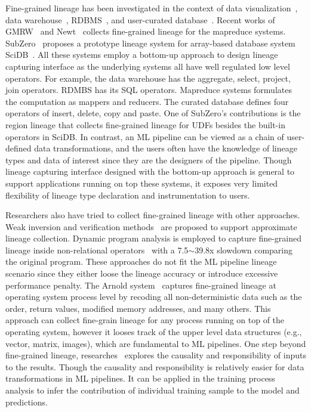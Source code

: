\documentclass{sig-alternate}
\begin{document}
Fine-grained lineage has been investigated in the context of data visualization~\cite{stonebraker93, woodruff97},  
data warehouse~\cite{cui00, cui03}, RDBMS~\cite{widom04}, and user-curated database~\cite{buneman06}.
Recent works of GMRW~\cite{ikeda11} and Newt~\cite{logothetis13} collects fine-grained lineage for the mapreduce
systems. SubZero~\cite{wu13} proposes a prototype lineage system for array-based database system SciDB~\cite{brown10}.
All these systems employ a bottom-up approach to design lineage capturing interface as the underlying systems all have well regulated low level operators.
For example, the data warehouse has the aggregate, select, project, join operators. 
RDMBS has its SQL operators. Mapreduce systems formulates the computation as mappers and reducers.
The curated database defines four operators of insert, delete, copy and paste.
One of SubZero's contributions is the region lineage that collects fine-grained lineage for UDFs besides the built-in operators in SciDB. 
In contrast, an ML pipeline can be viewed as a chain of user-defined data transformations, and the users often have the knowledge 
of lineage types and data of interest since they are the designers of the pipeline. 
Though lineage capturing interface designed with the bottom-up approach is general to support applications running on top these systems,
it exposes very limited flexibility of lineage type declaration and instrumentation to users.

Researchers also have tried to collect fine-grained lineage with other approaches.
Weak inversion and verification methods~\cite{woodruff97} are proposed to support approximate lineage collection.
Dynamic program analysis is employed to capture fine-grained lineage inside non-relational operators~\cite{zhang07} with 
a 7.5$\sim$39.8x slowdown comparing the original program. 
These approaches do not fit the ML pipeline lineage scenario since they either loose the lineage accuracy or introduce
excessive performance penalty.
The Arnold system~\cite{devecsery14} captures fine-grained lineage at operating system process level by recoding
all non-deterministic data such as the order, return values, modified memory addresses, and many others. 
This approach can collect fine-grain lineage for any process running on top of the operating system, however
it looses track of the upper level data structures (e.g., vector, matrix, images), which are fundamental to ML pipelines.
One step beyond fine-grained lineage, researches~\cite{meliou10, meliou11} explores the causality and responsibility
of inputs to the results. Though the causality and responsibility is relatively easier for data transformations in ML pipelines.
It can be applied in the training process analysis to infer the contribution of individual training sample to the model and predictions.
\end{document}

